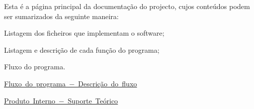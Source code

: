 Esta é a página principal da documentação do projecto, cujos conteúdos podem ser sumarizados da seguinte maneira\+:


\begin{DoxyEnumerate}
\item Listagem dos ficheiros que implementam o software;
\item Listagem e descrição de cada função do programa;
\item Fluxo do programa.
\end{DoxyEnumerate}

\mbox{\hyperlink{workflow}{Fluxo do programa − Descrição do fluxo}}

\mbox{\hyperlink{teoria}{Produto Interno − Suporte Teórico}} 